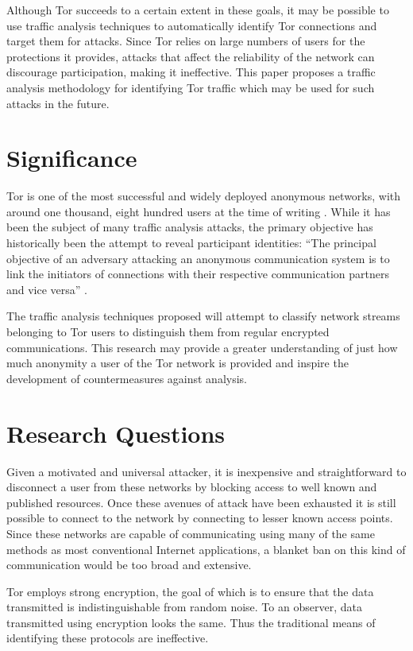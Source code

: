 \documentclass{ecuthesis}
\begin{document}
Although Tor succeeds to a certain extent in these goals, it may be possible to
use traffic analysis techniques to automatically identify Tor connections and
target them for attacks. Since Tor relies on large numbers of users for the
protections it provides, attacks that affect the reliability of the network can
discourage participation, making it ineffective. This paper proposes a traffic
analysis methodology for identifying Tor traffic which may be used for such
attacks in the future.

\section{Significance}

Tor is one of the most successful and widely deployed anonymous networks, with
around one thousand, eight hundred users at the time of writing
\parencite{website:tor-anonymity-online}. While it has been the subject of many
traffic analysis attacks, the primary objective has historically been the
attempt to reveal participant identities: ``The principal objective of an
adversary attacking an anonymous communication system is to link the initiators
of connections with their respective communication partners and vice versa''
\parencite[3]{Murdoch:2005p325}.

The traffic analysis techniques proposed will attempt to classify network
streams belonging to Tor users to distinguish them from regular encrypted
communications. This research may provide a greater understanding of just
how much anonymity a user of the Tor network is provided and inspire
the development of countermeasures against analysis.

\section{Research Questions}

Given a motivated and universal attacker, it is inexpensive and straightforward
to disconnect a user from these networks by blocking access to well known and
published resources. Once these avenues of attack have been exhausted it is
still possible to connect to the network by connecting to lesser known access
points. Since these networks are capable of communicating using many of the
same methods as most conventional Internet applications, a blanket ban on this
kind of communication would be too broad and extensive.

Tor employs strong encryption, the goal of which is to ensure that the data
transmitted is indistinguishable from random noise. To an observer, data
transmitted using encryption looks the same. Thus the traditional means of
identifying these protocols are ineffective.
\end{document}
